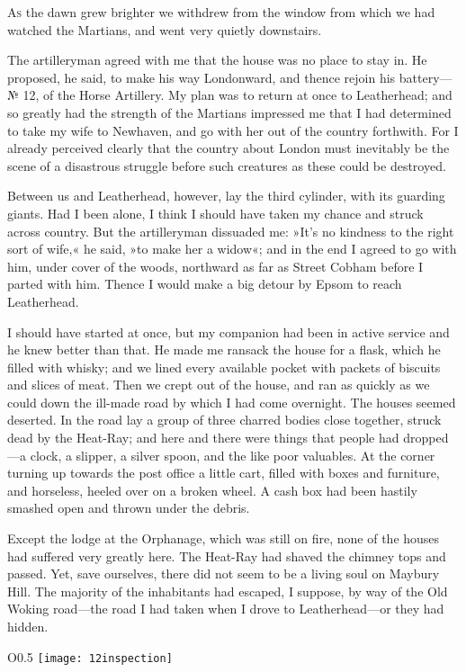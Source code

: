


\lettrine[lines=4]{A}{s} the dawn grew brighter we withdrew from the window from which we had watched the Martians, and went very quietly downstairs.

\zz
The artilleryman agreed with me that the house was no place to stay in. He proposed, he said, to make his way Londonward, and thence rejoin his battery—№ 12, of the Horse Artillery. My plan was to return at once to Leatherhead; and so greatly had the strength of the Martians impressed me that I had determined to take my wife to Newhaven, and go with her out of the country forthwith. For I already perceived clearly that the country about London must inevitably be the scene of a disastrous struggle before such creatures as these could be destroyed.

Between us and Leatherhead, however, lay the third cylinder, with its guarding giants. Had I been alone, I think I should have taken my chance and struck across country. But the artilleryman dissuaded me: »It's no kindness to the right sort of wife,« he said, »to make her a widow«; and in the end I agreed to go with him, under cover of the woods, northward as far as Street Cobham before I parted with him. Thence I would make a big detour by Epsom to reach Leatherhead.

I should have started at once, but my companion had been in active service and he knew better than that. He made me ransack the house for a flask, which he filled with whisky; and we lined every available pocket with packets of biscuits and slices of meat. Then we crept out of the house, and ran as quickly as we could down the ill-made road by which I had come overnight. The houses seemed deserted. In the road lay a group of three charred bodies close together, struck dead by the Heat-Ray; and here and there were things that people had dropped—a clock, a slipper, a silver spoon, and the like poor valuables. At the corner turning up towards the post office a little cart, filled with boxes and furniture, and horseless, heeled over on a broken wheel. A cash box had been hastily smashed open and thrown under the debris.

Except the lodge at the Orphanage, which was still on fire, none of the houses had suffered very greatly here. The Heat-Ray had shaved the chimney tops and passed. Yet, save ourselves, there did not seem to be a living soul on Maybury Hill. The majority of the inhabitants had escaped, I suppose, by way of the Old Woking road—the road I had taken when I drove to Leatherhead—or they had hidden.
\makeatletter
{}
{%

}{%
\begin{wrapfigure}{O}{0.5\textwidth}
\centering
\texttt{[image: 12inspection]}
\end{wrapfigure}
}
\makeatother


